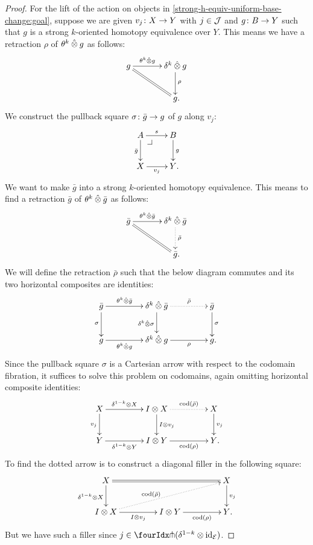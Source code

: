 \documentclass[reqno,10pt,a4paper,oneside,draft]{amsart}
\begin{document}
\begin{proof}
For the lift of the action on objects in \eqref{strong-h-equiv-uniform-base-change:goal}, suppose we are given $v_j \co X \to Y$ with $j \in \cal{J}$ and $g \co B \to Y$ such that $g$ is a strong $k$-oriented homotopy equivalence over $Y$.
This means we have a retraction $\rho$ of $\thetak \hatotimes g$ as follows:
\begin{align*}
\xymatrix@C+1em{
  g
  \ar[r]^-{\thetak \hatotimes g}
  \ar@{=}[dr]
&
  \kcyl \hatotimes g \ar[d]^{\rho}
\\&
  g
\rlap{.}}
\end{align*}
We construct the pullback square $\sigma \co \bar{g} \to g$ of $g$ along $v_j$:
\begin{equation} \label{strong-h-equiv-uniform-base-change:0}
\xycenter{
  A
  \ar[r]^-{s}
  \ar[d]_{\bar{g}}
  \pullback{dr}
&
  B
  \ar[d]^{g}
\\
  X
  \ar[r]_{v_j}
&
  Y
\rlap{.}}
\end{equation}
We want to make $\bar{g}$ into a strong $k$-oriented homotopy equivalence.
This means to find a retraction $\bar{g}$ of $\thetak \hatotimes \bar{g}$ as follows:
\[
\xymatrix@C+1em{
  \bar{g}
  \ar[r]^-{\thetak \hatotimes \bar{g}}
  \ar@{=}[dr]
&
  \kcyl \hatotimes \bar{g}
  \ar@{.>}[d]^{\bar{\rho}}
\\&
  \bar{g}
\rlap{.}}
\]
We will define the retraction $\bar{\rho}$ such that the below diagram commutes and its two horizontal composites are identities:
\[
\xymatrix@C+2em{
  \bar{g}
  \ar[r]^-{\thetak \hatotimes \bar{g}}
  \ar[d]_{\sigma}
&
  \kcyl \hatotimes \bar{g}
  \ar@{.>}[r]^-{\bar{\rho}}
  \ar[d]_{\kcyl \hatotimes \sigma}
&
  \bar{g}
  \ar[d]^{\sigma}
\\
  g
  \ar[r]_-{\thetak \hatotimes g}
&
  \kcyl \hatotimes g
  \ar[r]_-{\rho}
&
  g
\rlap{.}}
\]
Since the pullback square $\sigma$ is a Cartesian arrow with respect to the codomain fibration, it suffices to solve this problem on codomains, again omitting horizontal composite identities:
\[
\xymatrix@C+2em{
  X
  \ar[r]^-{\kcylinv \otimes X}
  \ar[d]_{v_j}
&
  \interval \otimes X
  \ar@{.>}[r]^-{\cod(\bar{\rho})}
  \ar[d]^{\interval \otimes v_j}
&
  X
  \ar[d]^{v_j}
\\
  Y
  \ar[r]_-{\kcylinv \otimes Y}
&
  \interval \otimes Y
  \ar[r]_-{\cod(\rho)}
&
  Y
\rlap{.}}
\]
To find the dotted arrow is to construct a diagonal filler in the following square:
\[
\xymatrix@C+2em{
  X
  \ar@{=}[rr]
  \ar[d]_{\kcylinv \otimes X}
&&
  X
  \ar[d]^{v_j}
\\
  \interval \otimes X
  \ar[r]_-{I \otimes v_j}
  \ar@{.>}[urr]^(0.4){\cod(\bar{\rho})}
&
  \interval \otimes Y
  \ar[r]_-{\cod(\rho)}
&
  Y
\rlap{.}}
\]
But we have such a filler since $j \in \liftr{(\kcylinv \otimes \id_\catE)}$.


\end{proof}
\end{document}
